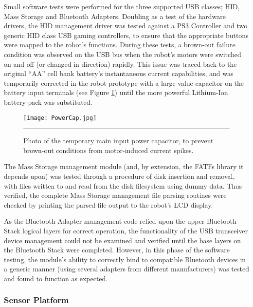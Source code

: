 Small software tests were performed for the three supported USB classes; HID, Mass Storage and Bluetooth Adapters. Doubling as a test of the hardware drivers, the HID management driver was tested against a PS3 Controller and two generic HID class USB gaming controllers, to ensure that the appropriate buttons were mapped to the robot's functions. During these tests, a brown-out failure condition was observed on the USB bus when the robot's motors were switched on and off (or changed in direction) rapidly. This issue was traced back to the original ``AA'' cell bank battery's instantaneous current capabilities, and was temporarily corrected in the robot prototype with a large value capacitor on the battery input terminals (see Figure \ref{fig:mainpowercap}) until the more powerful Lithium-Ion battery pack was substituted.

\begin{figure}[tbph]
	\vspace{1em}
	\centering
		\texttt{[image: PowerCap.jpg]}
	\rule{35em}{0.5pt}
	\caption[Temporary Main Power Input Capacitor]{Photo of the temporary main input power capacitor, to prevent brown-out conditions from motor-induced current spikes.}
	\label{fig:mainpowercap}
\end{figure}

The Mass Storage management module (and, by extension, the FATFs library it depends upon) was tested through a procedure of disk insertion and removal, with files written to and read from the disk filesystem using dummy data. Thus verified, the complete Mass Storage management file parsing routines were checked by printing the parsed file output to the robot's LCD display.

As the Bluetooth Adapter management code relied upon the upper Bluetooth Stack logical layers for correct operation, the functionality of the USB transceiver device management could not be examined and verified until the base layers on the Bluetooth Stack were completed. However, in this phase of the software testing, the module's ability to correctly bind to compatible Bluetooth devices in a generic manner (using several adapters from different manufacturers) was tested and found to function as expected.

\FloatBarrier
\subsubsection{Sensor Platform}

